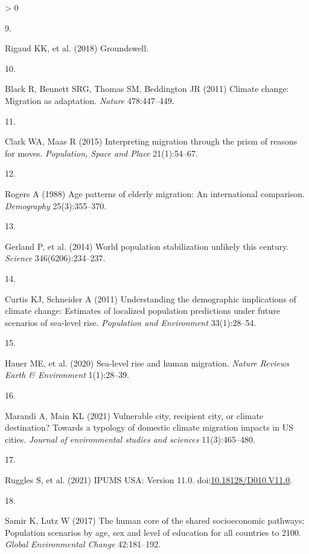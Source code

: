 \documentclass[9pt,twocolumn,twoside,]{pnas-new}
\newlength{\csllabelwidth}
\newlength{\cslhangindent}
\newenvironment{CSLReferences}[3] %
 {%
  \setlength{\parindent}{0pt}
  \ifodd #1 \everypar{\setlength{\hangindent}{\cslhangindent}}\ignorespaces\fi
  \ifnum #2 > 0
  \setlength{\parskip}{#3\baselineskip}
  \fi
 }%
 {}
\newcommand{\CSLLeftMargin}[1]{\parbox[t]{\maxof{\widthof{#1}}{\csllabelwidth}}{#1}}
\newcommand{\CSLRightInline}[1]{\parbox[t]{\linewidth}{#1}}
\begin{document}
\begin{CSLReferences}{0}{0}
\leavevmode\hypertarget{ref-rigaud2018groundswell}{}%
\CSLLeftMargin{9. }
\CSLRightInline{Rigaud KK, et al. (2018) Groundswell.}

\leavevmode\hypertarget{ref-blackClimateChangeMigration2011}{}%
\CSLLeftMargin{10. }
\CSLRightInline{Black R, Bennett SRG, Thomas SM, Beddington JR (2011)
Climate change: {Migration} as adaptation. \emph{Nature} 478:447--449.}

\leavevmode\hypertarget{ref-clarkInterpretingMigrationPrism2015}{}%
\CSLLeftMargin{11. }
\CSLRightInline{Clark WA, Maas R (2015) Interpreting migration through
the prism of reasons for moves. \emph{Population, Space and Place}
21(1):54--67.}

\leavevmode\hypertarget{ref-rogers1988age}{}%
\CSLLeftMargin{12. }
\CSLRightInline{Rogers A (1988) Age patterns of elderly migration: An
international comparison. \emph{Demography} 25(3):355--370.}

\leavevmode\hypertarget{ref-gerland2014world}{}%
\CSLLeftMargin{13. }
\CSLRightInline{Gerland P, et al. (2014) World population stabilization
unlikely this century. \emph{Science} 346(6206):234--237.}

\leavevmode\hypertarget{ref-curtisUnderstandingDemographicImplications2011}{}%
\CSLLeftMargin{14. }
\CSLRightInline{Curtis KJ, Schneider A (2011) Understanding the
demographic implications of climate change: Estimates of localized
population predictions under future scenarios of sea-level rise.
\emph{Population and Environment} 33(1):28--54.}

\leavevmode\hypertarget{ref-hauer2020sea}{}%
\CSLLeftMargin{15. }
\CSLRightInline{Hauer ME, et al. (2020) Sea-level rise and human
migration. \emph{Nature Reviews Earth \& Environment} 1(1):28--39.}

\leavevmode\hypertarget{ref-marandi2021vulnerable}{}%
\CSLLeftMargin{16. }
\CSLRightInline{Marandi A, Main KL (2021) Vulnerable city, recipient
city, or climate destination? Towards a typology of domestic climate
migration impacts in US cities. \emph{Journal of environmental studies
and sciences} 11(3):465--480.}

\leavevmode\hypertarget{ref-ruggles_steven_ipums_2021}{}%
\CSLLeftMargin{17. }
\CSLRightInline{Ruggles S, et al. (2021) {IPUMS} {USA}: {Version} 11.0.
doi:\href{https://doi.org/10.18128/D010.V11.0}{10.18128/D010.V11.0}.}

\leavevmode\hypertarget{ref-samir2017human}{}%
\CSLLeftMargin{18. }
\CSLRightInline{Samir K, Lutz W (2017) The human core of the shared
socioeconomic pathways: Population scenarios by age, sex and level of
education for all countries to 2100. \emph{Global Environmental Change}
42:181--192.}


\end{CSLReferences}
\end{document}
